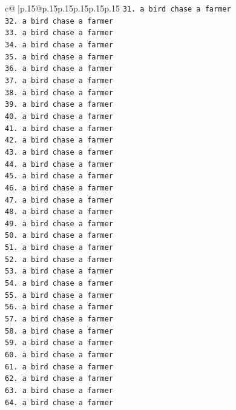 \documentclass{article}
\begin{document}
{\begin{supertabular}{c@{$\;$}|p{.15\linewidth}@{}p{.15\linewidth}p{.15\linewidth}p{.15\linewidth}p{.15\linewidth}p{.15\linewidth}}
{{{\texttt{31. a bird chase a farmer} \\
\texttt{32. a bird chase a farmer} \\
\texttt{33. a bird chase a farmer} \\
\texttt{34. a bird chase a farmer} \\
\texttt{35. a bird chase a farmer} \\
\texttt{36. a bird chase a farmer} \\
\texttt{37. a bird chase a farmer} \\
\texttt{38. a bird chase a farmer} \\
\texttt{39. a bird chase a farmer} \\
\texttt{40. a bird chase a farmer} \\
\texttt{41. a bird chase a farmer} \\
\texttt{42. a bird chase a farmer} \\
\texttt{43. a bird chase a farmer} \\
\texttt{44. a bird chase a farmer} \\
\texttt{45. a bird chase a farmer} \\
\texttt{46. a bird chase a farmer} \\
\texttt{47. a bird chase a farmer} \\
\texttt{48. a bird chase a farmer} \\
\texttt{49. a bird chase a farmer} \\
\texttt{50. a bird chase a farmer} \\
\texttt{51. a bird chase a farmer} \\
\texttt{52. a bird chase a farmer} \\
\texttt{53. a bird chase a farmer} \\
\texttt{54. a bird chase a farmer} \\
\texttt{55. a bird chase a farmer} \\
\texttt{56. a bird chase a farmer} \\
\texttt{57. a bird chase a farmer} \\
\texttt{58. a bird chase a farmer} \\
\texttt{59. a bird chase a farmer} \\
\texttt{60. a bird chase a farmer} \\
\texttt{61. a bird chase a farmer} \\
\texttt{62. a bird chase a farmer} \\
\texttt{63. a bird chase a farmer} \\
\texttt{64. a bird chase a farmer} \\
}}}
\end{supertabular}}
\end{document}

